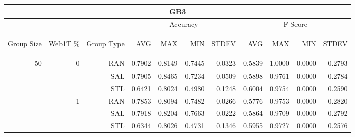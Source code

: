 \begin{center}
\begin{table}[htbp] 
 \begin{center}
\begin{tabular}{ | r | r | r | r | r | r | r | r | r | r | r |}
\hline
\multicolumn{11}{|c|}{GB3}\\
\hline
 & & & \multicolumn{4}{|c|}{Accuracy} & \multicolumn{4}{|c|}{F-Score}\\ \cline{4-11}
\begin{sideways}Group Size\end{sideways} & \begin{sideways}Web1T \%\end{sideways} & \begin{sideways}Group Type\end{sideways} & \begin{sideways}AVG\end{sideways} & \begin{sideways}MAX\end{sideways} & \begin{sideways}MIN\end{sideways} & \begin{sideways}STDEV\end{sideways} & \begin{sideways}AVG\end{sideways} & \begin{sideways}MAX\end{sideways} & \begin{sideways}MIN\end{sideways} & \begin{sideways}STDEV\end{sideways}\\
\hline
\multirow{12}{*}{50}
 & \multirow{3}{*}{0} & RAN & 0.7902 & 0.8149 & 0.7445 & 0.0323 & 0.5839 & 1.0000 & 0.0000 & 0.2793\\ \cline{3-11}
 &   & SAL & 0.7905 & 0.8465 & 0.7234 & 0.0509 & 0.5898 & 0.9761 & 0.0000 & 0.2784\\ \cline{3-11}
 &   & STL & 0.6421 & 0.8024 & 0.4980 & 0.1248 & 0.6004 & 0.9754 & 0.0000 & 0.2590\\ \cline{2-11}
 & \multirow{3}{*}{1} & RAN & 0.7853 & 0.8094 & 0.7482 & 0.0266 & 0.5776 & 0.9753 & 0.0000 & 0.2820\\ \cline{3-11}
 &   & SAL & 0.7918 & 0.8204 & 0.7663 & 0.0222 & 0.5864 & 0.9709 & 0.0000 & 0.2792\\ \cline{3-11}
 &   & STL & 0.6344 & 0.8026 & 0.4731 & 0.1346 & 0.5955 & 0.9727 & 0.0000 & 0.2576\\ \cline{2-11}

\end{tabular}
\end{center}
\end{table}
\end{center}
